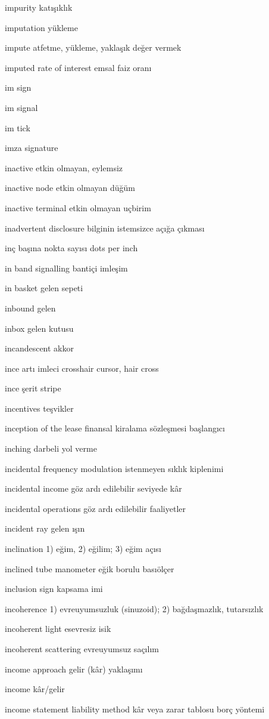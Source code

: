 \documentclass[12pt,fleqn]{article}\usepackage{../../common}
\begin{document}
impurity katışıklık

imputation yükleme

impute atfetme, yükleme, yaklaşık değer vermek

imputed rate of interest emsal faiz oranı

im sign

im signal

im tick

imza signature

inactive etkin olmayan, eylemsiz

inactive node etkin olmayan düğüm

inactive terminal etkin olmayan uçbirim

inadvertent disclosure bilginin istemsizce açığa çıkması

inç başına nokta sayısı dots per inch

in band signalling bantiçi imleşim

in basket gelen sepeti

inbound gelen

inbox gelen kutusu

incandescent akkor

ince artı imleci crosshair cursor, hair cross

ince şerit stripe

incentives teşvikler

inception of the lease finansal kiralama sözleşmesi başlangıcı

inching darbeli yol verme

incidental frequency modulation istenmeyen sıklık kiplenimi

incidental income göz ardı edilebilir seviyede kâr

incidental operations göz ardı edilebilir faaliyetler

incident ray gelen ışın

inclination 1) eğim, 2) eğilim; 3) eğim açısı

inclined tube manometer eğik borulu basıölçer

inclusion sign kapsama imi

incoherence 1) evreuyumsuzluk (sinuzoid); 2) bağdaşmazlık, tutarsızlık

incoherent light esevresiz isik

incoherent scattering evreuyumsuz saçılım

income approach gelir (kâr) yaklaşımı

income kâr/gelir

income statement liability method kâr veya zarar tablosu borç yöntemi
\end{document}
